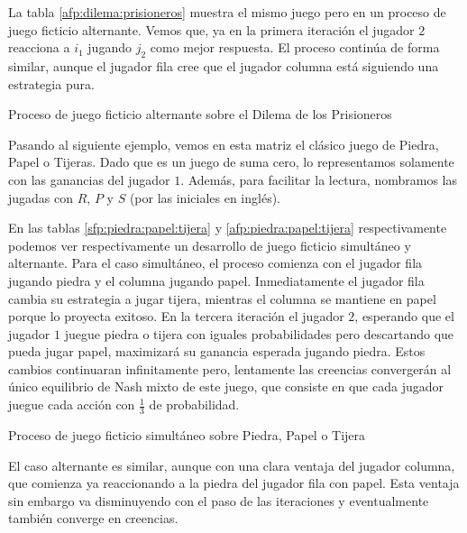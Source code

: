 La tabla \ref{afp:dilema:prisioneros} muestra el mismo juego pero en un proceso de juego ficticio alternante. Vemos que, ya en la primera iteración el jugador $2$ reacciona a $i_1$ jugando $j_2$ como mejor respuesta. El proceso continúa de forma similar, aunque el jugador fila cree que el jugador columna está siguiendo una estrategia pura.

\begin{table} %
    \centering
    
    \caption{Proceso de juego ficticio alternante sobre el Dilema de los Prisioneros}
    \label{afp:dilema:prisioneros}
\end{table}

Pasando al siguiente ejemplo, vemos en esta matriz el clásico juego de Piedra, Papel o Tijeras. Dado que es un juego de suma cero, lo representamos solamente con las ganancias del jugador $1$. Además, para facilitar la lectura, nombramos las jugadas con $R$, $P$ y $S$ (por las iniciales en inglés).



En las tablas \ref{sfp:piedra:papel:tijera} y \ref{afp:piedra:papel:tijera} respectivamente podemos ver respectivamente un desarrollo de juego ficticio simultáneo y alternante. Para el caso simultáneo, el proceso comienza con el jugador fila jugando piedra y el columna jugando papel. Inmediatamente el jugador fila cambia su estrategia a jugar tijera, mientras el columna se mantiene en papel porque lo proyecta exitoso. En la tercera iteración el jugador $2$, esperando que el jugador $1$ juegue piedra o tijera con iguales probabilidades pero descartando que pueda jugar papel, maximizará su ganancia esperada jugando piedra. Estos cambios continuaran infinitamente pero, lentamente las creencias convergerán al único equilibrio de Nash mixto de este juego, que consiste en que cada jugador juegue cada acción con $\frac{1}{3}$ de probabilidad.

\begin{table} %
    \centering
    
    \caption{Proceso de juego ficticio simultáneo sobre Piedra, Papel o Tijera}
    \label{sfp:piedra:papel:tijera}
\end{table}

El caso alternante es similar, aunque con una clara ventaja del jugador columna, que comienza ya reaccionando a la piedra del jugador fila con papel. Esta ventaja sin embargo va disminuyendo con el paso de las iteraciones y eventualmente también converge en creencias.


